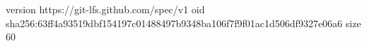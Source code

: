 version https://git-lfs.github.com/spec/v1
oid sha256:63ff4a93519dbf154197c01488497b9348ba106f7f9f01ac1d506df9327e06a6
size 60
